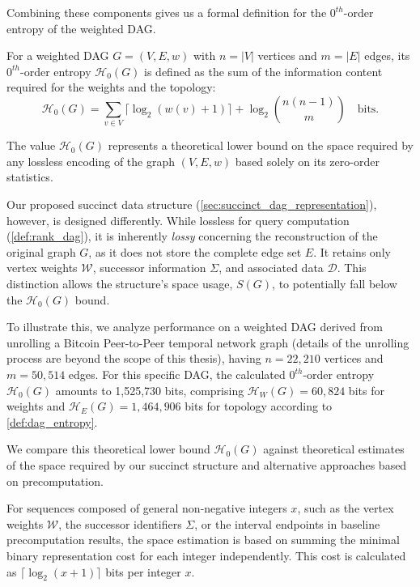 Combining these components gives us a formal definition for the $0^{th}$-order entropy of the weighted DAG.

\begin{definition}
    \label{def:dag_entropy}
    For a weighted DAG $G = (V, E, w)$ with $n=|V|$ vertices and $m=|E|$ edges, its $0^{th}$-order entropy $\mathcal{H}_0(G)$ is defined as the sum of the information content required for the weights and the topology:
    \[ \mathcal{H}_0(G) = \sum_{v \in V} \lceil \log_2 (w(v)+1) \rceil + \log_2 \binom{n(n-1)}{m} \quad \text{bits}. \]
\end{definition}

The value $\mathcal{H}_0(G)$ represents a theoretical lower bound on the space required by any lossless encoding of the graph $(V, E, w)$ based solely on its zero-order statistics.

Our proposed succinct data structure (\autoref{sec:succinct_dag_representation}), however, is designed differently. While lossless for \Rank{} query computation (\ref{def:rank_dag}), it is inherently \emph{lossy} concerning the reconstruction of the original graph $G$, as it does not store the complete edge set $E$. It retains only vertex weights $\mathcal{W}$, successor information $\Sigma$, and associated data $\mathcal{D}$. This distinction allows the structure's space usage, $S(G)$, to potentially fall below the $\mathcal{H}_0(G)$ bound.

To illustrate this, we analyze performance on a weighted DAG derived from unrolling a Bitcoin Peer-to-Peer temporal network graph \cite{kumar2018rev2} (details of the unrolling process are beyond the scope of this thesis), having $n = 22,210$ vertices and $m = 50,514$ edges. For this specific DAG, the calculated $0^{th}$-order entropy $\mathcal{H}_0(G)$ amounts to 1,525,730 bits, comprising $\mathcal{H}_W(G) = 60,824$ bits for weights and $\mathcal{H}_E(G) = 1,464,906$ bits for topology according to \ref{def:dag_entropy}.

We compare this theoretical lower bound $\mathcal{H}_0(G)$ against theoretical estimates of the space required by our succinct structure and alternative approaches based on precomputation.

For sequences composed of general non-negative integers $x$, such as the vertex weights $\mathcal{W}$, the successor identifiers $\Sigma$, or the interval endpoints in baseline precomputation results, the space estimation is based on summing the minimal binary representation cost for each integer independently. This cost is calculated as $\lceil \log_2(x+1) \rceil$ bits per integer $x$.

